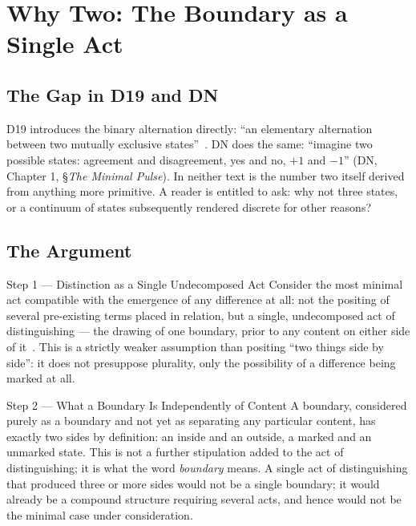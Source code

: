 \documentclass[11pt,a4paper]{article}
\begin{document}
\section{Why Two: The Boundary as a Single Act}
\label{sec:why_two}

\subsection{The Gap in D19 and DN}

D19 introduces the binary alternation directly: ``an elementary alternation between two mutually exclusive states''~\citep[\S 2]{D19}. DN does the same: ``imagine two possible states: agreement and disagreement, yes and no, $+1$ and $-1$'' (DN, Chapter 1, \S \emph{The Minimal Pulse}). In neither text is the number two itself derived from anything more primitive. A reader is entitled to ask: why not three states, or a continuum of states subsequently rendered discrete for other reasons?

\subsection{The Argument}

\begin{argumentbox}{Step 1 --- Distinction as a Single Undecomposed Act}
Consider the most minimal act compatible with the emergence of any difference at all: not the positing of several pre-existing terms placed in relation, but a single, undecomposed act of distinguishing --- the drawing of one boundary, prior to any content on either side of it~\citep{SpencerBrown1969}. This is a strictly weaker assumption than positing ``two things side by side'': it does not presuppose plurality, only the possibility of a difference being marked at all.
\end{argumentbox}

\begin{argumentbox}{Step 2 --- What a Boundary Is Independently of Content}
A boundary, considered purely as a boundary and not yet as separating any particular content, has exactly two sides by definition: an inside and an outside, a marked and an unmarked state. This is not a further stipulation added to the act of distinguishing; it is what the word \emph{boundary} means. A single act of distinguishing that produced three or more sides would not be a single boundary; it would already be a compound structure requiring several acts, and hence would not be the minimal case under consideration.
\end{argumentbox}
\end{document}
